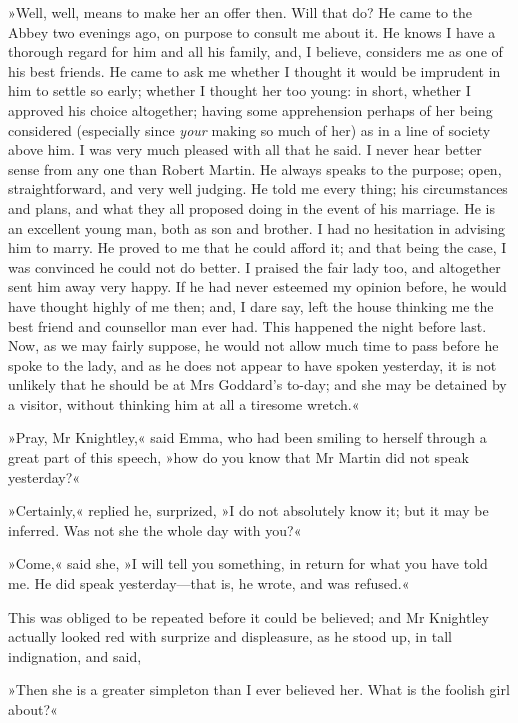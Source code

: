»Well, well, means to make her an offer then. Will that do? He came to the Abbey two evenings ago, on purpose to consult me about it. He knows I have a thorough regard for him and all his family, and, I believe, considers me as one of his best friends. He came to ask me whether I thought it would be imprudent in him to settle so early; whether I thought her too young: in short, whether I approved his choice altogether; having some apprehension perhaps of her being considered (especially since \textit{your} making so much of her) as in a line of society above him. I was very much pleased with all that he said. I never hear better sense from any one than Robert Martin. He always speaks to the purpose; open, straightforward, and very well judging. He told me every thing; his circumstances and plans, and what they all proposed doing in the event of his marriage. He is an excellent young man, both as son and brother. I had no hesitation in advising him to marry. He proved to me that he could afford it; and that being the case, I was convinced he could not do better. I praised the fair lady too, and altogether sent him away very happy. If he had never esteemed my opinion before, he would have thought highly of me then; and, I dare say, left the house thinking me the best friend and counsellor man ever had. This happened the night before last. Now, as we may fairly suppose, he would not allow much time to pass before he spoke to the lady, and as he does not appear to have spoken yesterday, it is not unlikely that he should be at Mrs Goddard's to-day; and she may be detained by a visitor, without thinking him at all a tiresome wretch.«

»Pray, Mr Knightley,« said Emma, who had been smiling to herself through a great part of this speech, »how do you know that Mr Martin did not speak yesterday?«

»Certainly,« replied he, surprized, »I do not absolutely know it; but it may be inferred. Was not she the whole day with you?«

»Come,« said she, »I will tell you something, in return for what you have told me. He did speak yesterday—that is, he wrote, and was refused.«

This was obliged to be repeated before it could be believed; and Mr Knightley actually looked red with surprize and displeasure, as he stood up, in tall indignation, and said,

»Then she is a greater simpleton than I ever believed her. What is the foolish girl about?«

